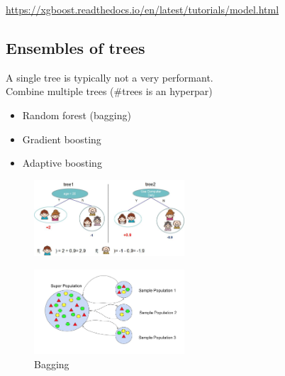 \url{https://xgboost.readthedocs.io/en/latest/tutorials/model.html}


\subsection{Ensembles of trees}

A single tree is typically not a very performant.\\
Combine multiple trees (\#trees is an hyperpar)
\begin{itemize}
	\item Random forest (bagging)
	\item Gradient boosting
	\item Adaptive boosting
\end{itemize}

\begin{figure}[ht]
	\centering
	\includegraphics[width=0.5\textwidth]{figure_ml/trees.png}
\end{figure}
\FloatBarrier

\begin{figure}[ht]
	\centering
	\includegraphics[width=0.5\textwidth]{figure_ml/bagging.png}
	\caption{Bagging}
\end{figure}
\FloatBarrier



